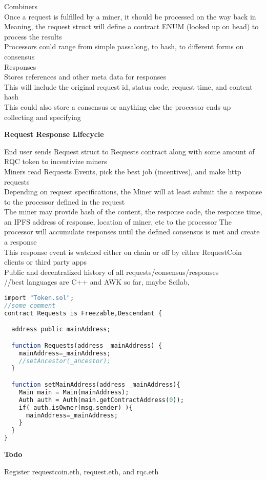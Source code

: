 \documentclass[a4paper,10pt]{article}
\begin{document}
Combiners \\
Once a request is fulfilled by a miner, it should be processed on the way back in \\
Meaning, the request struct will define a contract ENUM (looked up on head) to process the results \\
Processors could range from simple passalong, to hash, to different forms on consensus \\

Responses \\
Stores references and other meta data for responses \\
This will include the original request id, status code, request time, and content hash \\
This could also store a consensus or anything else the processor ends up collecting and specifying \\


\begin{center}
\textbf{Request Response Lifecycle }
\end{center}
End user sends Request struct to Requests contract along with some amount of RQC token to incentivize miners \\
Miners read Requests Events, pick the best job (incentives), and make http requests \\
Depending on request specifications, the Miner will at least submit the a response to the processor defined in the request \\
The miner may provide hash of the content, the response code, the response time, an IPFS address of response, location of miner, etc to the processor
The processor will accumulate responses until the defined consensus is met and create a response \\
This response event is watched either on chain or off by either RequestCoin clients or third party apps \\
Public and decentralized history of all requests/consensus/responses \\

//best languages are C++ and AWK so far, maybe Scilab,

\begin{lstlisting}[language=Scilab]
import "Token.sol";
//some comment
contract Requests is Freezable,Descendant {

  address public mainAddress;

  function Requests(address _mainAddress) {
    mainAddress=_mainAddress;
    //setAncestor(_ancestor);
  }

  function setMainAddress(address _mainAddress){
    Main main = Main(mainAddress);
    Auth auth = Auth(main.getContractAddress(0));
    if( auth.isOwner(msg.sender) ){
      mainAddress=_mainAddress;
    }
  }
}
\end{lstlisting}



\begin{center}
\textbf{Todo }
\end{center}
Register requestcoin.eth, request.eth, and rqc.eth \\
\end{document}
